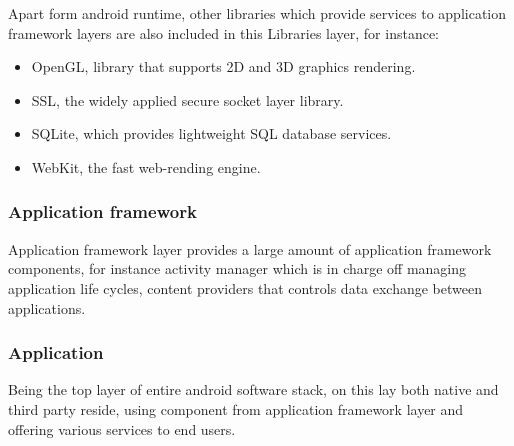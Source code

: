 Apart form  android runtime, other libraries which provide services to application framework layers are also included in this Libraries layer, for instance:
\begin{itemize}
\item OpenGL, library that supports 2D and 3D graphics rendering.
\item SSL, the widely applied secure socket layer library.
\item  SQLite, which provides lightweight SQL database services.
\item  WebKit, the fast  web-rending engine.
\end{itemize}
\subsubsection{Application  framework} Application framework layer provides a large amount of application framework components, for instance activity manager which is in charge off managing application life cycles, content providers that controls data exchange between applications.
\subsubsection{Application}Being the top layer of entire android software stack, on this lay both native and third party reside, using component from  application framework layer and   offering various services to end users.

